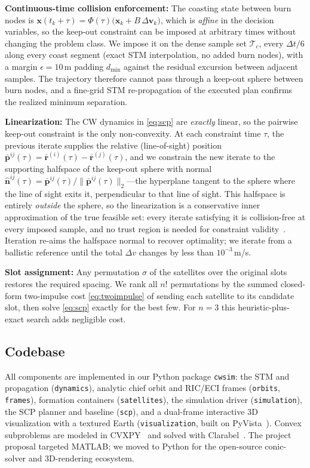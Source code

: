 \documentclass[10pt,twocolumn,letterpaper]{article}
\begin{document}
\textbf{Continuous-time collision enforcement:} The coasting state between
burn nodes is $\mathbf{x}(t_k + \tau) = \Phi(\tau)\bigl(\mathbf{x}_k +
B\,\Delta\mathbf{v}_k\bigr)$, which is \emph{affine} in the decision
variables, so the keep-out constraint can be imposed at arbitrary times
without changing the problem class. We impose it on the dense sample set
$\mathcal{T}_c$, every $\Delta t / 6$ along every coast segment (exact STM
interpolation, no added burn nodes), with a margin $\epsilon = 10$\,m padding
$d_{\min}$ against the residual excursion between adjacent samples. The
trajectory therefore cannot pass through a keep-out sphere between burn
nodes, and a fine-grid STM re-propagation of the executed plan confirms the
realized minimum separation.

\textbf{Linearization:} The CW dynamics in \eqref{eq:scp} are \emph{exactly}
linear, so the pairwise keep-out constraint is the only non-convexity. At
each constraint time $\tau$, the previous iterate supplies the relative
(line-of-sight) position $\bar{\mathbf{p}}^{ij}(\tau) =
\bar{\mathbf{r}}^{(i)}(\tau) - \bar{\mathbf{r}}^{(j)}(\tau)$, and we
constrain the new iterate to the supporting halfspace of the keep-out sphere
with normal $\hat{\mathbf{n}}^{ij}(\tau) = \bar{\mathbf{p}}^{ij}(\tau) /
\|\bar{\mathbf{p}}^{ij}(\tau)\|_2$---the hyperplane tangent to the sphere
where the line of sight exits it, perpendicular to that line of sight. This
halfspace is entirely \emph{outside} the sphere, so the linearization is a
conservative inner approximation of the true feasible set: every iterate
satisfying it is collision-free at every imposed sample, and no trust region
is needed for constraint validity~\cite{morgan2014,mao2016}. Iteration
re-aims the halfspace normal to recover optimality; we iterate from a
ballistic reference until the total $\Delta v$ changes by less than
$10^{-3}$\,m/s.

\textbf{Slot assignment:} Any permutation $\sigma$ of the satellites over the
original slots restores the required spacing. We rank all $n!$ permutations by
the summed closed-form two-impulse cost \eqref{eq:twoimpulse} of sending each
satellite to its candidate slot, then solve \eqref{eq:scp} exactly for the
best few. For $n{=}3$ this heuristic-plus-exact search adds negligible cost.

\subsection{Codebase}

All components are implemented in our Python package \texttt{cwsim}: the STM
and propagation (\texttt{dynamics}), analytic chief orbit and RIC/ECI frames
(\texttt{orbits}, \texttt{frames}), formation containers
(\texttt{satellites}), the simulation driver (\texttt{simulation}), the SCP
planner and baseline (\texttt{scp}), and a dual-frame interactive 3D
visualization with a textured Earth (\texttt{visualization}, built on
PyVista~\cite{sullivan2019}). Convex subproblems are modeled in
CVXPY~\cite{diamond2016} and solved with Clarabel~\cite{clarabel2024}. The
project proposal targeted MATLAB; we moved to Python for the open-source
conic-solver and 3D-rendering ecosystem.
\end{document}
